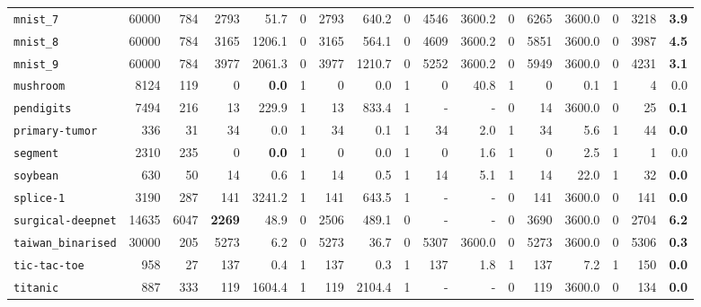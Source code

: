 \begin{tabular}{lccrrrrrrrrrrrrrr}
\texttt{mnist\_7} & \multicolumn{1}{r}{60000} & \multicolumn{1}{r}{784}  & 2793 & 51.7 & 0 & 2793 & 640.2 & 0 & 4546 & 3600.2 & 0 & 6265 & 3600.0 & 0 & 3218 & \textbf{3.9}\\
\texttt{mnist\_8} & \multicolumn{1}{r}{60000} & \multicolumn{1}{r}{784}  & 3165 & 1206.1 & 0 & 3165 & 564.1 & 0 & 4609 & 3600.2 & 0 & 5851 & 3600.0 & 0 & 3987 & \textbf{4.5}\\
\texttt{mnist\_9} & \multicolumn{1}{r}{60000} & \multicolumn{1}{r}{784}  & 3977 & 2061.3 & 0 & 3977 & 1210.7 & 0 & 5252 & 3600.2 & 0 & 5949 & 3600.0 & 0 & 4231 & \textbf{3.1}\\
\texttt{mushroom} & \multicolumn{1}{r}{8124} & \multicolumn{1}{r}{119}  & 0 & \textbf{0.0} & 1 & 0 & 0.0 & 1 & 0 & 40.8 & 1 & 0 & 0.1 & 1 & 4 & 0.0\\
\texttt{pendigits} & \multicolumn{1}{r}{7494} & \multicolumn{1}{r}{216}  & 13 & 229.9 & 1 & 13 & 833.4 & 1 & - & - & 0 & 14 & 3600.0 & 0 & 25 & \textbf{0.1}\\
\texttt{primary-tumor} & \multicolumn{1}{r}{336} & \multicolumn{1}{r}{31}  & 34 & 0.0 & 1 & 34 & 0.1 & 1 & 34 & 2.0 & 1 & 34 & 5.6 & 1 & 44 & \textbf{0.0}\\
\texttt{segment} & \multicolumn{1}{r}{2310} & \multicolumn{1}{r}{235}  & 0 & \textbf{0.0} & 1 & 0 & 0.0 & 1 & 0 & 1.6 & 1 & 0 & 2.5 & 1 & 1 & 0.0\\
\texttt{soybean} & \multicolumn{1}{r}{630} & \multicolumn{1}{r}{50}  & 14 & 0.6 & 1 & 14 & 0.5 & 1 & 14 & 5.1 & 1 & 14 & 22.0 & 1 & 32 & \textbf{0.0}\\
\texttt{splice-1} & \multicolumn{1}{r}{3190} & \multicolumn{1}{r}{287}  & 141 & 3241.2 & 1 & 141 & 643.5 & 1 & - & - & 0 & 141 & 3600.0 & 0 & 141 & \textbf{0.0}\\
\texttt{surgical-deepnet} & \multicolumn{1}{r}{14635} & \multicolumn{1}{r}{6047}  & \textbf{2269} & 48.9 & 0 & 2506 & 489.1 & 0 & - & - & 0 & 3690 & 3600.0 & 0 & 2704 & \textbf{6.2}\\
\texttt{taiwan\_binarised} & \multicolumn{1}{r}{30000} & \multicolumn{1}{r}{205}  & 5273 & 6.2 & 0 & 5273 & 36.7 & 0 & 5307 & 3600.0 & 0 & 5273 & 3600.0 & 0 & 5306 & \textbf{0.3}\\
\texttt{tic-tac-toe} & \multicolumn{1}{r}{958} & \multicolumn{1}{r}{27}  & 137 & 0.4 & 1 & 137 & 0.3 & 1 & 137 & 1.8 & 1 & 137 & 7.2 & 1 & 150 & \textbf{0.0}\\
\texttt{titanic} & \multicolumn{1}{r}{887} & \multicolumn{1}{r}{333}  & 119 & 1604.4 & 1 & 119 & 2104.4 & 1 & - & - & 0 & 119 & 3600.0 & 0 & 134 & \textbf{0.0}\\

\end{tabular}
